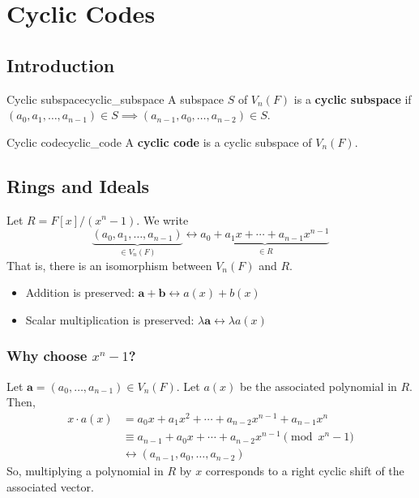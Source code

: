 \chapter{Cyclic Codes}
\section{Introduction}

\begin{Definition}{Cyclic subspace}{cyclic_subspace}
    A subspace $ S $ of $ V_n(F) $ is a \textbf{cyclic subspace}
    if $ (a_0,a_1,\ldots ,a_{n-1})\in S\implies
        (a_{n-1},a_0,\ldots , a_{n-2})\in S $.
\end{Definition}

\begin{Definition}{Cyclic code}{cyclic_code}
    A \textbf{cyclic code} is a cyclic subspace of $ V_n(F) $.
\end{Definition}

\section{Rings and Ideals}

Let $ R=F[x]/(x^n-1) $. We write
\[ \underbrace{(a_0,a_1,\ldots ,a_{n-1})}_{\in V_n(F)}
    \longleftrightarrow \underbrace{{a_0+a_1x+\cdots+a_{n-1}}x^{n-1}}_{\in R} \]
That is, there is an isomorphism between $ V_n(F) $ and $ R $.
\begin{itemize}
    \item Addition is preserved: $ \symbf{a}+\symbf{b}\longleftrightarrow a(x)+b(x) $
    \item Scalar multiplication is preserved: $ \lambda\symbf{a} \longleftrightarrow \lambda a(x) $
\end{itemize}
\subsection*{Why choose $ x^n -1$?}
Let $ \symbf{a}=(a_0,\ldots ,a_{n-1})\in V_n(F) $. Let $ a(x) $ be the associated
polynomial in $ R $. Then,
\begin{align*}
    x\cdot a(x)
     & =a_0x+a_1x^2+\cdots+a_{n-2}x^{n-1}+a_{n-1}x^n           \\
     & \equiv a_{n-1}+a_0x+\cdots+a_{n-2}x^{n-1} \pmod{x^n -1} \\
     & \longleftrightarrow (a_{n-1},a_0,\ldots ,a_{n-2})
\end{align*}
So, multiplying a polynomial in $ R $ by $ x $ corresponds
to a right cyclic shift of the associated vector.

